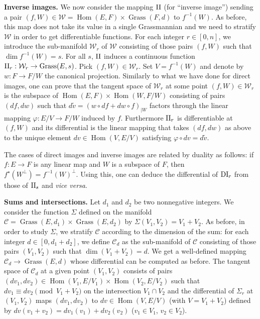 \documentclass{sig-alternate}
\DeclareMathOperator{\Hom}{Hom}
\DeclareMathOperator{\Grass}{Grass}
\newtheorem{rem}[theo]{Remark}
\newcommand{\DI}{\text{\rm DI}}
\newcommand{\II}{\text{\rm II}}
\begin{document}
\smallskip

\noindent
{\bf Inverse images.}
We now consider the mapping $\II$ (for ``inverse image'') sending a 
pair $(f,W) \in \mathcal W = \Hom(E,F) \times \Grass(F,d)$ to 
$f^{-1}(W)$. As before, this map does not take its value in a single 
Grassmannian and we need to stratify $\mathcal W$ in order to get 
differentiable functions. For each integer $r \in [0,n]$, we introduce 
the sub-manifold $\mathcal W_r$ of $\mathcal W$ consisting of those 
pairs $(f,W)$ such that $\dim f^{-1}(W) = s$. For all $s$, $\II$ 
induces a continuous function
$\II_r : \mathcal W_r \to \Grass(E,s)$.
Pick $(f,W) \in \mathcal W_r$. Set $V = f^{-1}(W)$ and denote by $w : F 
\to F/W$ the canonical projection.
Similarly to what we have done for direct images, one can prove that
the tangent space of $\mathcal W_r$ at some point $(f,W) \in \mathcal
W_r$ is the subspace of $\Hom(E,F) \times \Hom(W,F/W)$ consisting of 
pairs $(df,dw)$ such that
$d \tilde v = (w \circ df + dw \circ f)_{|W}$
factors through the linear mapping $\varphi : E/V \to F/W$ induced by 
$f$. Furthermore $\II_r$ is differentiable at $(f,W)$ and its 
differential is the linear mapping that takes $(df,dw)$ as above to the 
unique element $dv \in \Hom(V,E/V)$ satisfying $\varphi \circ dv =
d\tilde v$.

The cases of direct images and inverse images are related by duality
as follows: if $f : E \to F$ is any linear map and $W$ is a subspace
of $F$, then $f^\star(W^\perp) = f^{-1}(W)^\perp$. Using this, one 
can deduce the differential of $\DI_r$ from those of $\II_s$ and 
\emph{vice versa}.


\smallskip

\noindent
{\bf Sums and intersections.}
Let $d_1$ and $d_2$ be two nonnegative integers. We consider the 
function $\Sigma$ defined on the manifold $\mathcal C = \Grass(E,d_1) 
\times \Grass(E,d_2)$ by $\Sigma(V_1, V_2) = V_1 + V_2$. As before, in 
order to study $\Sigma$, we stratify $\mathcal C$ according to the 
dimension of the sum: for each integer $d \in [0, d_1+d_2]$, we define 
$\mathcal C_d$ as the sub-manifold of $\mathcal C$ consisting of those 
pairs $(V_1, V_2)$ such that $\dim(V_1 + V_2) = d$. We get a 
well-defined mapping $\mathcal C_d \to \Grass(E,d)$ whose differential
can be computed as before. The
tangent space of $\mathcal C_d$ at a given point $(V_1, V_2)$ consists 
of pairs $(dv_1, dv_2) \in \Hom(V_1, E/V_1)
\times \Hom(V_2, E/V_2)$ such that $dv_1 \equiv dv_2 \pmod{V_1 + V_2}$ 
on the intersection $V_1 \cap V_2$ and the differential of $\Sigma_r$
at $(V_1, V_2)$ maps $(dv_1, dv_2)$ to $dv \in \Hom(V, E/V)$ (with $V
= V_1 + V_2$) defined by $dv(v_1 + v_2) = dv_1(v_1) + dv_2(v_2)$ ($v_1
\in V_1$, $v_2 \in V_2$).
\end{document}
